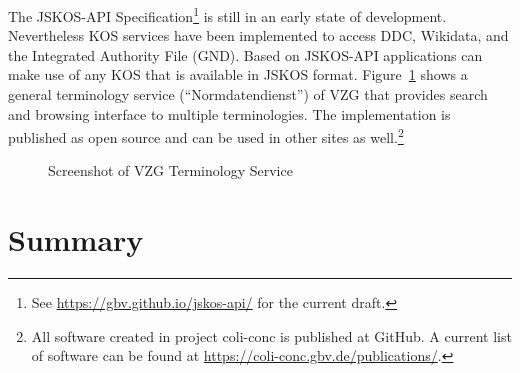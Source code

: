 \documentclass[12pt,a4paper]{llncs}
\begin{document}
The JSKOS-API Specification\footnote{See \href{https://gbv.github.io/jskos-api/}{https://gbv.github.io/jskos-api/} for the current draft.} is still in an early state of development. Nevertheless KOS services have been implemented to access DDC, Wikidata, and the Integrated Authority File (GND). 
Based on JSKOS-API applications can make use of any KOS that is available in JSKOS format. Figure~\ref{fig:normdatenservice} shows a general terminology service (``Normdatendienst'') of VZG that provides search and browsing interface to multiple terminologies.
The implementation is published as open source and can be used in other sites as well.\footnote{All software created in project coli-conc is published at GitHub. A current list of software can be found at \href{https://coli-conc.gbv.de/publications/}{https://coli-conc.gbv.de/publications/}.}


\begin{figure}
\centering
{}
\caption{Screenshot of VZG Terminology Service}
\label{fig:normdatenservice}
\end{figure}


\section{Summary}
\end{document}
